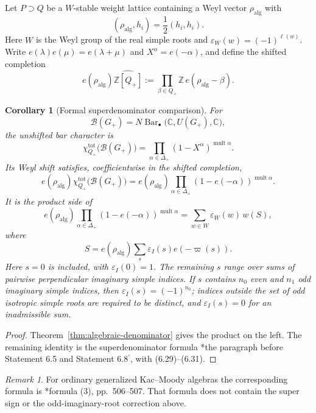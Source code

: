 \documentclass[11pt,reqno]{amsart}
\newtheorem{corollary}[theorem]{Corollary}
\theoremstyle{definition}
\theoremstyle{remark}
\newtheorem{remark}[theorem]{Remark}
\newcommand{\Barc}{\operatorname{Bar}}
\begin{document}
Let \(P\supset Q\) be a \(W\)-stable weight lattice containing a Weyl
vector \(\rho_{\mathrm{alg}}\) with
\[
 (\rho_{\mathrm{alg}},h_i)=\frac12(h_i,h_i).
\]
Here \(W\) is the Weyl group of the real simple roots and
\(\varepsilon_W(w)=(-1)^{\ell(w)}\).  Write
\(e(\lambda)e(\mu)=e(\lambda+\mu)\) and
\(X^\alpha=e(-\alpha)\), and define the shifted completion
\[
 e(\rho_{\mathrm{alg}})\widehat{\mathbb Z[Q_+]}
 :=
 \prod_{\beta\in Q_+}
 \mathbb Z\,e(\rho_{\mathrm{alg}}-\beta).
\]

\begin{corollary}[Formal superdenominator comparison]
\label{cor:formal-superdenominator}
For
\[
 \mathcal B(G_+)
 =N\Barc_\bullet\bigl(\mathbb C,U(G_+),\mathbb C\bigr),
\]
the unshifted bar character is
\[
 \chi_{Q_+}^{\mathrm{tot}}\bigl(\mathcal B(G_+)\bigr)
 =
 \prod_{\alpha\in\Delta_+}
 (1-X^\alpha)^{\operatorname{mult}\alpha}.
\]
Its Weyl shift satisfies, coefficientwise in the shifted completion,
\[
 e(\rho_{\mathrm{alg}})
 \chi_{Q_+}^{\mathrm{tot}}\bigl(\mathcal B(G_+)\bigr)
 =
 e(\rho_{\mathrm{alg}})
 \prod_{\alpha\in\Delta_+}
 (1-e(-\alpha))^{\operatorname{mult}\alpha}.
\]
It is the product side of
\[
 e(\rho_{\mathrm{alg}})
 \prod_{\alpha\in\Delta_+}
 (1-e(-\alpha))^{\operatorname{mult}\alpha}
 =
 \sum_{w\in W}\varepsilon_W(w)\,w(S),
\]
where
\[
 S=e(\rho_{\mathrm{alg}})
   \sum_s\varepsilon_I(s)e(-\varpi(s)).
\]
Here \(s=0\) is included, with \(\varepsilon_I(0)=1\).  The remaining
\(s\) range over sums of pairwise perpendicular imaginary simple
indices.  If \(s\) contains \(n_0\) even and \(n_1\) odd imaginary
simple indices, then \(\varepsilon_I(s)=(-1)^{n_0}\); indices outside
the set of odd isotropic simple roots are required to be distinct, and
\(\varepsilon_I(s)=0\) for an inadmissible sum.
\end{corollary}

\begin{proof}
Theorem~\ref{thm:algebraic-denominator} gives the product on the left.
The remaining identity is the superdenominator formula
\cite{GN97}*{the paragraph before Statement 6.5 and Statement
6.8\(^{\prime}\), with (6.29)--(6.31)}.
\end{proof}

\begin{remark}
For ordinary generalized Kac--Moody algebras the corresponding formula
is \cite{Bor88}*{formula (3), pp.~506--507}.  That formula does not
contain the super sign or the odd-imaginary-root correction above.
\end{remark}
\end{document}
